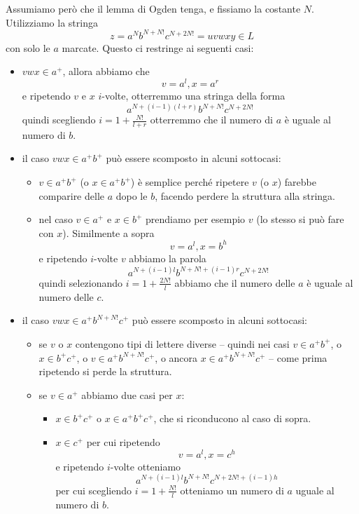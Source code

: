 \documentclass[12pt, answers]{exam}
\begin{document}
\begin{questions}
\begin{solution}
		Assumiamo però che il lemma di Ogden tenga, e fissiamo la costante $N$.
		Utilizziamo la stringa
		$$ z = a^N b^{N + N!} c^{N + 2N!} = uvwxy \in L $$
		con solo le $a$ marcate.
		Questo ci restringe ai seguenti casi:
		\begin{itemize}
			\item $vwx \in a^+$, allora abbiamo che 
				$$ v = a^l, x = a^r$$
			e ripetendo $v$ e $x$ $i$-volte, otterremmo una stringa della forma
				$$ a^{N + (i - 1)(l + r)} b^{N + N!} c^{N + 2N!} $$
			quindi scegliendo $i = 1 + \frac{N!}{l + r}$ otterremmo che il numero di $a$ è uguale al numero di $b$.
			\item il caso $vwx \in a^+ b^+$ può essere scomposto in alcuni sottocasi:
				\begin{itemize}
					\item $v \in a^+ b^+$ (o $x \in a^+ b^+$) è semplice perché ripetere $v$ (o $x$) farebbe comparire delle $a$ dopo le $b$, facendo perdere la struttura alla stringa.
					\item nel caso $v \in a^+$ e $x \in b^+$ prendiamo per esempio $v$ (lo stesso si può fare con $x$).
						Similmente a sopra 
						$$v = a^l, x = b^h $$
						e ripetendo $i$-volte $v$ abbiamo la parola
						$$ a^{N + (i - 1)l} b^{N + N! + (i - 1)r} c^{N + 2N!} $$
						quindi selezionando $i = 1 + \frac{2N!}{l}$ abbiamo che il numero delle $a$ è uguale al numero delle $c$.
				\end{itemize}
			\item il caso $vwx \in a^+ b^{N + N!} c^+$ può essere scomposto in alcuni sottocasi:
				\begin{itemize}
					\item se $v$ o $x$ contengono tipi di lettere diverse -- quindi nei casi $v \in a^+ b^+$, o $x \in b^+ c^+$, o $v \in a^+ b^{N + N!} c^+$, o ancora $x \in a^+ b^{N + N!} c^+$ -- come prima ripetendo si perde la struttura.
					\item se $v \in a^+$ abbiamo due casi per $x$:
						\begin{itemize}
							\item $x \in b^+ c^+$ o $x \in a^+ b^+ c^+$, che si riconducono al caso di sopra.
							\item $x \in c^+$ per cui ripetendo 
								$$ v = a^l, x = c^h $$
								e ripetendo $i$-volte otteniamo
								$$ a^{N + (i - 1)l} b^{N + N!} c^{N + 2N! + (i - 1)h} $$
								per cui scegliendo $i = 1 + \frac{N!}{l}$ otteniamo un numero di $a$ uguale al numero di $b$.
						\end{itemize}
				\end{itemize}
		\end{itemize}


\end{solution}
\end{questions}
\end{document}
